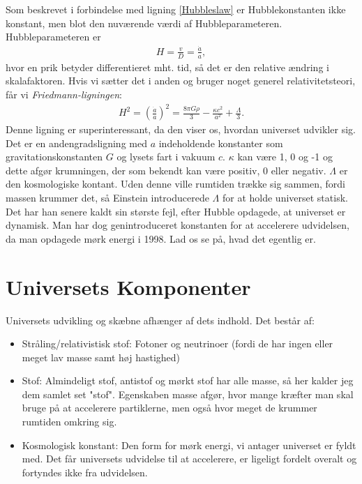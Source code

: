 Som beskrevet %
i forbindelse med ligning \ref{Hubbleslaw} er Hubblekonstanten ikke konstant, men blot den nuværende værdi af Hubbleparameteren. Hubbleparameteren er
\begin{align}
H=\frac{v}{D}=\frac{\dot{a}}{a},
\end{align}
hvor en prik betyder differentieret mht. tid, så det er den relative ændring i skalafaktoren. Hvis vi sætter det i anden og bruger noget generel relativitetsteori, får vi \emph{Friedmann-ligningen}:
\begin{align}
H^2=\left(\frac{\dot{a}}{a}\right)^2=\frac{8\pi G \rho}{3}-\frac{\kappa c^2}{a^2}+\frac{\Lambda}{3}. \label{friedmann}
\end{align}
Denne ligning er superinteressant, da den viser os, hvordan universet udvikler sig. Det er en andengradsligning med $a$ indeholdende konstanter som gravitationskonstanten $G$ og lysets fart i vakuum $c$. $\kappa$ kan være 1, 0 og -1 og dette afgør krumningen, der som bekendt kan være positiv, 0 eller negativ. $\Lambda$ er den kosmologiske kontant. Uden denne ville rumtiden trække sig sammen, fordi massen krummer det, så Einstein introducerede $\Lambda$ for at holde universet statisk. Det har han senere kaldt sin største fejl, efter Hubble opdagede, at universet er dynamisk. Man har dog genintroduceret konstanten for at accelerere udvidelsen, da man opdagede mørk energi i 1998. Lad os se på, hvad det egentlig er.

\section{Universets Komponenter} \label{bestanddele}
Universets udvikling og skæbne afhænger af dets indhold. Det består af:
\begin{itemize}
	\item Stråling/relativistisk stof: Fotoner og neutrinoer (fordi de har ingen eller meget lav masse samt høj hastighed)
	\item Stof: Almindeligt stof, antistof og mørkt stof har alle masse, så her kalder jeg dem samlet set "stof". Egenskaben masse afgør, hvor mange kræfter man skal bruge på at accelerere partiklerne, men også hvor meget de krummer rumtiden omkring sig. 
	\item Kosmologisk konstant: Den form for mørk energi, vi antager universet er fyldt med. Det får universets udvidelse til at accelerere, er ligeligt fordelt overalt og fortyndes ikke fra udvidelsen.
\end{itemize}

